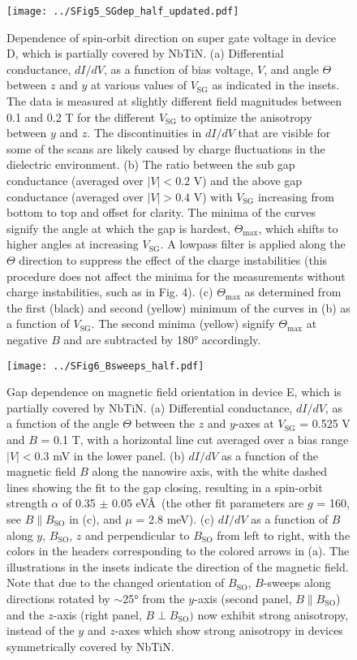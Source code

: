 \begin{figure}[p!]
\centering
\texttt{[image: ../SFig5\_SGdep\_half\_updated.pdf]}
\caption{\label{fig:SGdep}
    Dependence of spin-orbit direction on super gate voltage in device D, which is partially covered by NbTiN. 
    (a) Differential conductance, $dI/dV$, as a function of bias voltage, $V$, and angle $\Theta$ between $z$ and $y$ at various values of $V_{\mathrm{SG}}$ as indicated in the insets. The data is measured at slightly different field magnitudes between 0.1 and 0.2 T for the different $V_{\mathrm{SG}}$ to optimize the anisotropy between $y$ and $z$. The discontinuities in $dI/dV$ that are visible for some of the scans are likely caused by charge fluctuations in the dielectric environment. (b) The ratio between the sub gap conductance (averaged over $|V| < 0.2$ V) and the above gap conductance (averaged over $|V| > 0.4$ V) with $V_{\mathrm{SG}}$ increasing from bottom to top and offset for clarity. The minima of the curves signify the angle at which the gap is hardest, $\Theta_{\mathrm{max}}$, which shifts to higher angles at increasing $V_{\mathrm{SG}}$. A lowpass filter is applied along the $\Theta$ direction to suppress the effect of the charge instabilities (this procedure does not affect the minima for the measurements without charge instabilities, such as in Fig. 4). (c) $\Theta_{\mathrm{max}}$ as determined from the first (black) and second (yellow) minimum of the curves in (b) as a function of $V_{\mathrm{SG}}$. The second minima (yellow) signify $\Theta_{\mathrm{max}}$ at negative $B$ and are subtracted by \ang{180} accordingly.
}
\end{figure}

\begin{figure}[p!]
\centering
\texttt{[image: ../SFig6\_Bsweeps\_half.pdf]}
\caption{\label{fig:BsweepsHalf}
    Gap dependence on magnetic field orientation in device E, which is partially covered by NbTiN.
    (a) Differential conductance, $dI/dV$, as a function of the angle $\Theta$ between the $z$ and $y$-axes at $V_{\mathrm{SG}}$ = 0.525 V and $B$ = 0.1 T, with a horizontal line cut averaged over a bias range $|V| < 0.3$ mV in the lower panel. (b) $dI/dV$ as a function of the magnetic field $B$ along the nanowire axis, with the white dashed lines showing the fit to the gap closing, resulting in a spin-orbit strength $\alpha$ of 0.35 $\pm$ 0.05 eV\AA\ (the other fit parameters are $g$ = 160, see $B \parallel B_{\mathrm{SO}}$ in (c), and $\mu$ = 2.8 meV). (c) $dI/dV$ as a function of $B$ along $y$, $B_{\mathrm{SO}}$, $z$ and perpendicular to $B_{\mathrm{SO}}$ from left to right, with the colors in the headers corresponding to the colored arrows in (a). The illustrations in the insets indicate the direction of the magnetic field. Note that due to the changed orientation of $B_{\mathrm{SO}}$, $B$-sweeps along directions rotated by $\sim$\ang{25} from the $y$-axis (second panel, $B \parallel B_{\mathrm{SO}}$) and the $z$-axis (right panel, $B \perp B_{\mathrm{SO}})$  now exhibit strong anisotropy, instead of the $y$ and $z$-axes which show strong anisotropy in devices symmetrically covered by NbTiN. 
}
\end{figure}

